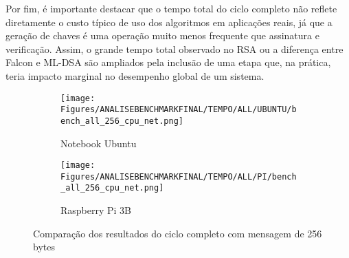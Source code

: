 Por fim, é importante destacar que o tempo total do ciclo completo não reflete diretamente o custo típico de uso dos algoritmos em aplicações reais, já que a geração de chaves é uma operação muito menos frequente que assinatura e verificação. Assim, o grande tempo total observado no RSA ou a diferença entre Falcon e ML-DSA são ampliados pela inclusão de uma etapa que, na prática, teria impacto marginal no desempenho global de um sistema.


\begin{figure}[h!]
    \centering
    \begin{subfigure}{1\textwidth}
        \texttt{[image: Figures/ANALISEBENCHMARKFINAL/TEMPO/ALL/UBUNTU/bench\_all\_256\_cpu\_net.png]}
        \caption{Notebook Ubuntu}
    \end{subfigure}
    \par\vspace{1em}
    \begin{subfigure}{1\textwidth}
        \texttt{[image: Figures/ANALISEBENCHMARKFINAL/TEMPO/ALL/PI/bench\_all\_256\_cpu\_net.png]}
        \caption{Raspberry Pi 3B}
    \end{subfigure}
    \caption{Comparação dos resultados do ciclo completo com mensagem de 256 bytes}
    \label{fig:BENCHFINAL_ALL256_TIME}
\end{figure}

